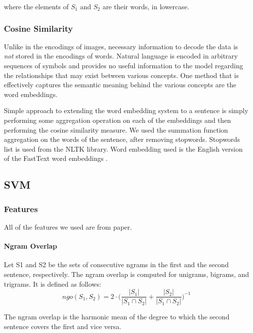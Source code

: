 \documentclass[10pt, a4paper]{article}
\begin{document}
where the elements of $S_1$ and $S_2$ are their words, in lowercase.

\subsubsection{Cosine Similarity}

Unlike in the encodings of images, necessary information to decode the data is \textit{not} stored in the encodings of words.
Natural language is encoded in arbitrary sequences of symbols and provides no useful information to the model regarding the relationships that may exist between various concepts.
One method that is effectively captures the semantic meaning behind the various concepts are the word embeddings.

Simple approach to extending the word embedding system to a sentence is simply performing some aggregation operation on each of the embeddings and then performing the cosine similarity measure.
We used the summation function aggregation on the words of the sentence, after removing stopwords.
Stopwords list is used from the NLTK library.
Word embedding used is the English version of the FastText word embeddings \citep{joulin2016fasttext}.

\subsection{SVM}

\subsubsection{Features}
All of the features we used are from \citep{Saric2012TakeLabSF} paper.
\paragraph{Ngram Overlap \\}
Let S1 and S2 be the sets of consecutive ngrams in the first and the second sentence, respectively. The ngram overlap is computed for unigrams, bigrams, and trigrams. It is defined as follows:
\begin{equation}\label{eq:ngo}
ngo(S_1, S_2) = 2 \cdot \bigg( \frac{|S_1|}{|S_1 \cap S_2|}+\frac{|S_2|}{|S_1 \cap S_2|}\bigg)^{-1}
\end{equation}

The ngram overlap is the harmonic mean of the degree
to which the second sentence covers the first
and vice versa.\citep{Saric2012TakeLabSF}
\end{document}

